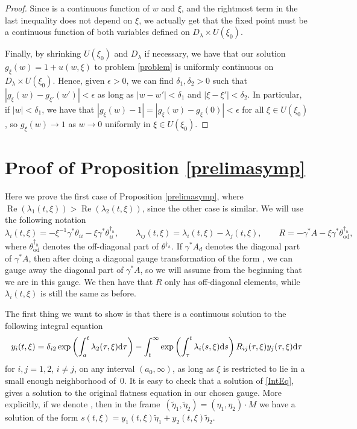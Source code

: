 \begin{proof}
Since  is a continuous function of $w$ and $\xi$, and the rightmost term in the last inequality does not depend on $\xi$, we actually get that the fixed point must be a continuous function of both variables defined on $D_{\lambda}\times U(\xi_0)$.

Finally, by shrinking $U(\xi_0)$ and $D_{\lambda}$ if necessary, we have that our solution $g_{\xi}(w)=1+u(w,\xi)$ to problem \eqref{problem} is uniformly continuous on $D_{\lambda}\times U(\xi_0)$. Hence, given $\epsilon>0$, we can find $\delta_1,\delta_2>0$ such that $|g_{\xi}(w)-g_{\xi'}(w')|<\epsilon$ as long as $|w-w'|<\delta_1$ and $|\xi-\xi'|<\delta_2$. In particular, if $|w|<\delta_1$, we have that
$
 |g_{\xi}(w)-1|=|g_{\xi}(w)-g_{\xi}(0)|<\epsilon $ for all $\xi \in U(\xi_0)$,
so $g_{\xi}(w)\to 1$ as $w\to 0$ uniformly in $\xi \in U(\xi_0)$.
\end{proof}

\section{Proof of Proposition \ref{prelimasymp}}\label{AD}

Here we prove the first case of Proposition \ref{prelimasymp}, where $\operatorname{Re}(\lambda_1(t,\xi))>\operatorname{Re}(\lambda_2(t,\xi))$, since the other case is similar. We will use the following notation
\begin{equation*}
 \lambda_i(t,\xi)= -\xi^{-1}\gamma^*\theta_{ii} - \xi \gamma^* \theta^{\dagger_h}_{ii},\qquad
 \lambda_{ij}(t,\xi)=\lambda_i(t,\xi)-\lambda_j(t,\xi),\qquad
 R= -\gamma^*A -\xi \gamma^* \theta^{\dagger_h}_{\text{od}},
\end{equation*}
where $\theta^{\dagger_h}_{\text{od}}$ denotes the off-diagonal part of $\theta^{\dagger_h}$. If $\gamma^*A_d$ denotes the diagonal part of $\gamma^*A$, then after doing a diagonal gauge transformation of the form , we can gauge away the diagonal part of $\gamma^*A$, so we will assume from the beginning that we are in this gauge. We then have that $R$ only has off-diagonal elements, while $\lambda_i(t,\xi)$ is still the same as before.

The first thing we want to show is that there is a continuous solution to the following integral equation
\begin{gather}
 y_i(t,\xi) = \delta_{i2}\exp \left(\int_{a}^{t}\lambda_2(\tau,\xi){\rm d}\tau \right)- \int_{t}^{\infty}\exp \left(\int_{\tau}^{t}\lambda_i(s,\xi){\rm d}s\right)R_{ij}(\tau,\xi)y_j(\tau,\xi){\rm d}\tau\label{IntEq}
\end{gather}
for $i,j=1,2$, $i\neq j$, on any interval $(a_0,\infty)$, as long as $\xi$ is restricted to lie in a small enough neighborhood of~$0$. It is easy to check that a solution of \eqref{IntEq}, gives a solution to the original flatness equation in our chosen gauge. More explicitly, if we denote , then in the frame~$(\widetilde{\eta}_1,\widetilde{\eta}_2)=(\eta_1,\eta_2)\cdot M$ we have a solution of the form $s(t,\xi)=y_1(t,\xi)\widetilde{\eta}_1+y_2(t,\xi)\widetilde{\eta}_2$.

